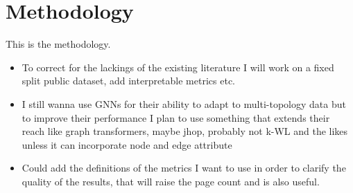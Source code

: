 \section*{Methodology}

This is the methodology.

\begin{itemize}
    \item To correct for the lackings of the existing literature I will work on a fixed split public dataset, add interpretable metrics etc.
    \item I still wanna use GNNs for their ability to adapt to multi-topology data but to improve their performance I plan to use something that extends their reach like graph transformers, maybe jhop, probably not k-WL and the likes unless it can incorporate node and edge attribute
    \item Could add the definitions of the metrics I want to use in order to clarify the quality of the results, that will raise the page count and is also useful.
\end{itemize}